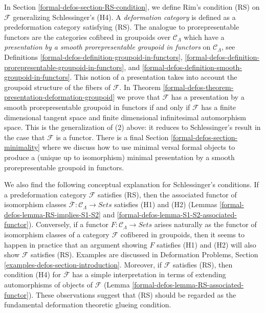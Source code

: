 \medskip\noindent
In Section \ref{formal-defos-section-RS-condition},
we define Rim's condition (RS) on $\mathcal{F}$ generalizing
Schlessinger's (H4). A {\it deformation category} is defined as a
predeformation category satisfying (RS).
The analogue to prorepresentable functors are the categories
cofibred in groupoids over $\mathcal{C}_\Lambda$ which have
a {\it presentation by a smooth prorepresentable groupoid in functors}
on $\mathcal{C}_\Lambda$, see
Definitions \ref{formal-defos-definition-groupoid-in-functors},
\ref{formal-defos-definition-prorepresentable-groupoid-in-functors}, and
\ref{formal-defos-definition-smooth-groupoid-in-functors}.
This notion of a presentation takes into account the groupoid structure
of the fibers of $\mathcal{F}$. In
Theorem \ref{formal-defos-theorem-presentation-deformation-groupoid}
we prove that $\mathcal{F}$ has a presentation by a smooth prorepresentable
groupoid in functors if and only if $\mathcal{F}$ has a finite dimensional
tangent space and finite dimensional infinitesimal automorphism space.
This is the generalization of (2) above: it reduces to Schlessinger's result
in the case that $\mathcal{F}$ is a functor.
There is a final
Section \ref{formal-defos-section-minimality}
where we discuss how to use minimal versal formal objects
to produce a (unique up to isomorphism) minimal presentation
by a smooth prorepresentable groupoid in functors.

\medskip\noindent
We also find the following conceptual explanation for Schlessinger's
conditions. If a predeformation category $\mathcal{F}$ satisfies (RS),
then the associated functor of isomorphism classes
$\overline{\mathcal{F}}: \mathcal{C}_\Lambda \to \textit{Sets}$
satisfies (H1) and (H2)
(Lemmas \ref{formal-defos-lemma-RS-implies-S1-S2} and
\ref{formal-defos-lemma-S1-S2-associated-functor}).
Conversely, if a functor
$F : \mathcal{C}_\Lambda \to \textit{Sets}$
arises naturally as the functor of isomorphism classes of
a category $\mathcal{F}$ cofibered in groupoids, then it seems to happen in
practice that an argument showing $F$ satisfies (H1) and (H2) will also show
$\mathcal{F}$ satisfies (RS). Examples are discussed in
Deformation Problems, Section
\ref{examples-defos-section-introduction}.
Moreover, if $\mathcal{F}$ satisfies (RS), then condition
(H4) for $\overline{\mathcal{F}}$ has a simple interpretation in terms of
extending automorphisms of objects of $\mathcal{F}$
(Lemma \ref{formal-defos-lemma-RS-associated-functor}).
These observations suggest that (RS) should be regarded as the
fundamental deformation theoretic glueing condition.

